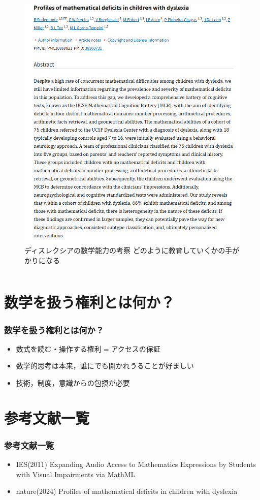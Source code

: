 \documentclass[dvipdfmx,cjk]{beamer}
\theoremstyle{example}
\begin{document}
\begin{frame}
\begin{columns}
\begin{column}{0.5\textwidth}
\begin{figure}
                \includegraphics[scale=0.1]{profiles.png}
                \caption{ディスレクシアの数学能力の考察 どのように教育していくかの手がかりになる}
            \end{figure}
        \end{column}
    \end{columns}
\end{frame}

\section{数学を扱う権利とは何か？}
\begin{frame}
    \frametitle{数学を扱う権利とは何か？}
    \begin{itemize}
        \item 数式を読む・操作する権利$=$アクセスの保証
        \item 数学的思考は本来，誰にでも開かれうることが好ましい
        \item 技術，制度，意識からの包摂が必要
    \end{itemize}
\end{frame}

\section{参考文献一覧}
\begin{frame}
    \frametitle{参考文献一覧}
    \begin{itemize}
        \item IES(2011) Expanding Audio Access to Mathematics Expressions by Students with Visual Impairments via MathML
        \item nature(2024) Profiles of mathematical deficits in children with dyslexia
    \end{itemize}
\end{frame}
\end{document}
